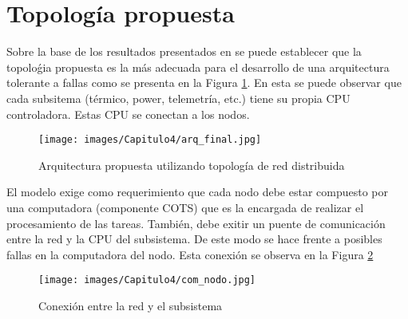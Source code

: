 \section{Topología propuesta}
Sobre la base de los resultados presentados en \citep{Arias17} se puede establecer que la topoloǵia propuesta es la más adecuada para el desarrollo de una arquitectura tolerante a fallas como se presenta en la Figura \ref{fig:topo_propuesta}. En esta se puede observar que cada subsitema (térmico, power, telemetría, etc.) tiene su propia CPU controladora. Estas CPU se conectan a los nodos.

\begin{figure}[h!]
 \centering
 \texttt{[image: images/Capitulo4/arq\_final.jpg]}
  \caption{Arquitectura propuesta utilizando topología de red distribuida}
\label{fig:topo_propuesta}
\end{figure}

El modelo exige como requerimiento que cada nodo debe estar compuesto por una computadora (componente COTS) que es la encargada de realizar el procesamiento de las tareas. También, debe exitir un puente de comunicación entre la red y la CPU del subsistema. De este modo se hace frente a posibles fallas en la computadora del nodo. Esta conexión se observa en la Figura \ref{fig:conn_prop}

\begin{figure}[h!]
 \centering
 \texttt{[image: images/Capitulo4/com\_nodo.jpg]}
 \caption{Conexión entre la red y el subsistema}
\label{fig:conn_prop}
\end{figure}
